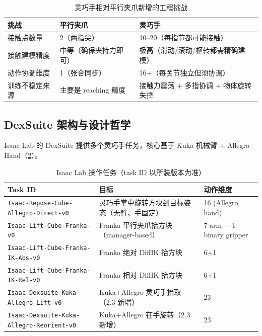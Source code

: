 \begin{table}[ht]
\centering
\small
\caption{灵巧手相对平行夹爪新增的工程挑战}
\label{tab:rlmc-manip-dexchallenge}
\begin{tabular}{@{}lll@{}}
\toprule
挑战 & 平行夹爪 & 灵巧手 \\
\midrule
接触点数量 & 2（两指尖） & 10--20（每指节都可能接触） \\
接触建模精度 & 中等（确保夹持力即可） & 极高（滑动/滚动/枢转都需精确建模） \\
动作协调维度 & 1（张合同步） & 16+（每关节独立但须协调） \\
训练不稳定来源 & 主要是 reaching 精度 & 接触力震荡 + 多指协调 + 物体旋转失控 \\
\bottomrule
\end{tabular}
\end{table}

\subsection{DexSuite 架构与设计哲学}
\label{sec:rlmc-manip-dexsuite}

Isaac Lab 的 DexSuite 提供多个灵巧手任务，核心基于 Kuka 机械臂 + Allegro Hand（\cref{tab:rlmc-manip-dextasks}）。

\begin{table}[ht]
\centering
\small
\caption{Isaac Lab 操作任务（task ID 以所装版本为准）}
\label{tab:rlmc-manip-dextasks}
\begin{tabular}{@{}lll@{}}
\toprule
Task ID & 目标 & 动作维度 \\
\midrule
\verb|Isaac-Repose-Cube-Allegro-Direct-v0| & 灵巧手掌中旋转方块到目标姿态（无臂、手固定） & 16 (Allegro hand) \\
\verb|Isaac-Lift-Cube-Franka-v0| & Franka 平行夹爪抬方块（manager-based） & 7 arm + 1 binary gripper \\
\verb|Isaac-Lift-Cube-Franka-IK-Abs-v0| & Franka 绝对 DiffIK 抬方块 & 6+1 \\
\verb|Isaac-Lift-Cube-Franka-IK-Rel-v0| & Franka 相对 DiffIK 抬方块 & 6+1 \\
\verb|Isaac-Dexsuite-Kuka-Allegro-Lift-v0| & Kuka+Allegro 灵巧手抬取（2.3 新增） & 23 \\
\verb|Isaac-Dexsuite-Kuka-Allegro-Reorient-v0| & Kuka+Allegro 在手旋转（2.3 新增） & 23 \\
\bottomrule
\end{tabular}
\end{table}

